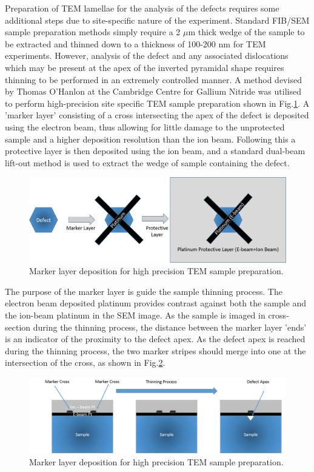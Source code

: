 Preparation of TEM lamellae for the analysis of the defects requires some additional steps due to site-specific nature of the experiment. Standard FIB/SEM sample preparation methods simply require a 2 $\mu$m thick wedge of the sample to be extracted and thinned down to a thickness of 100-200 nm for TEM experiments. However, analysis of the defect and any associated dislocations which may be present at the apex of the inverted pyramidal shape \cite{Watanabe2003,Shiojiri2006} requires thinning to be performed in an extremely controlled manner. A method devised by Thomas O'Hanlon at the Cambridge Centre for Gallium Nitride was utilised to perform high-precision site specific TEM sample preparation shown in Fig.\ref{FIBprep}. A 'marker layer' consisting of a cross intersecting the apex of the defect is deposited using the electron beam, thus allowing for little damage to the unprotected sample and a higher deposition resolution than the ion beam. Following this a protective layer is then deposited using the ion beam, and a standard dual-beam lift-out method is used to extract the wedge of sample containing the defect. 

\begin{figure}[!ht]
	\centering
	\includegraphics[width=1\textwidth]{Figs/Ch3/FIB-spot}
	\caption[h] {Marker layer deposition for high precision TEM sample preparation.}
	\label{FIBprep}
\end{figure}
\FloatBarrier 

The purpose of the marker layer is guide the sample thinning process. The electron beam deposited platinum provides contrast against both the sample and the ion-beam platinum in the SEM image. As the sample is imaged in cross-section during the thinning process, the distance between the marker layer 'ends' is an indicator of the proximity to the defect apex. As the defect apex is reached during the thinning process, the two marker stripes should merge into one at the intersection of the cross, as shown in Fig.\ref{FIBloc}.

\begin{figure}[!ht]
	\centering
	\includegraphics[width=1\textwidth]{Figs/Ch3/FIB-loc-diagram}
	\caption[h] {Marker layer deposition for high precision TEM sample preparation.}
	\label{FIBloc}
\end{figure}
\FloatBarrier 

